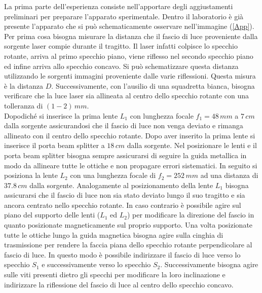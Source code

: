 La prima parte dell'esperienza consiste nell'apportare degli aggiustamenti preliminari per preparare l'apparato sperimentale.
Dentro il laboratorio è già presente l'apparato che si può schematicamente osservare nell'immagine (\ref{App}). Per prima cosa bisogna misurare la distanza che il fascio di luce proveniente dalla sorgente laser compie durante il tragitto. Il laser infatti colpisce lo specchio rotante, arriva al primo specchio piano, viene riflesso nel secondo specchio piano ed infine arriva allo specchio concavo. Si può schematizzare questa distanza utilizzando le sorgenti immagini proveniente dalle varie riflessioni. Questa misura è la distanza $D$. Successivamente, con l'ausilio di una squadretta bianca, bisogna verificare che la luce laser sia allineata al centro dello specchio rotante con una tolleranza di $(1-2)\,mm$. \\


Dopodiché si inserisce la prima lente $L_1$ con lunghezza focale $f_1=48\,mm$ a $7 \,cm$ dalla sorgente assicurandosi che il fascio di luce non venga deviato e rimanga allineato con il centro dello specchio rotante. Dopo aver inserito la prima lente si inserisce il porta beam splitter a $18 \,cm$ dalla sorgente. Nel posizionare le lenti e il porta beam splitter bisogna sempre assicurarsi di seguire la guida metallica in modo da allineare tutte le ottiche e non propagare errori sistematici. In seguito si posiziona la lente $L_2$ con una lunghezza focale di $f_2=252\, mm$ ad una distanza di $37.8\,cm$ dalla sorgente. Analogamente al posizionamento della lente $L_1$ bisogna assicurarsi che il fascio di luce non sia stato deviato lungo il suo tragitto e sia ancora centrato nello specchio rotante. In caso contrario è possibile agire sul piano del supporto delle lenti ($L_1$ ed $L_2$) per modificare la direzione del fascio in quanto posizionate magneticamente sul proprio supporto. Una volta posizionate tutte le ottiche lungo la guida magnetica bisogna agire sulla cinghia di trasmissione per rendere la faccia piana dello specchio rotante perpendicolare al fascio di luce. In questo modo è possibile indirizzare il fascio di luce verso lo specchio $S_1$ e successivamente verso lo specchio $S_2$. Successivamente bisogna agire sulle viti presenti dietro gli specchi per modificare la loro inclinazione e indirizzare la riflessione del fascio di luce al centro dello specchio concavo.\\

